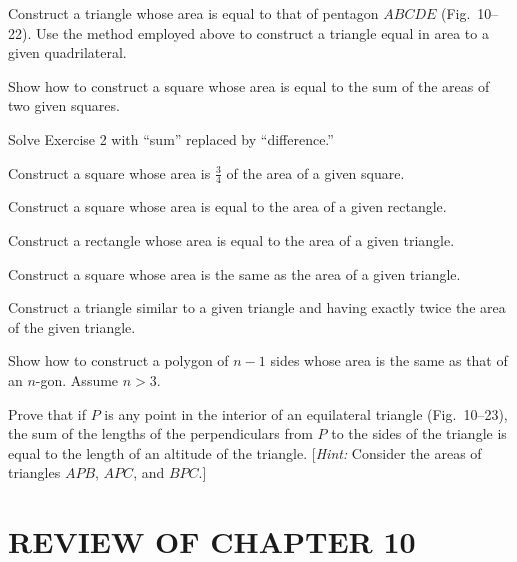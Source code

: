 \documentclass[11pt]{book}
\begin{document}
\FIGXTWENTYONE

\begin{exercisecols}
\begin{exlist}
\item Construct a triangle whose area is equal to that of pentagon $ABCDE$
  (Fig.~10--22). Use the method employed above to construct a triangle equal in
  area to a given quadrilateral.
\exfig{\FIGXTWENTYTWO}
\item Show how to construct a square whose area is equal to the sum of the
  areas of two given squares.
\item Solve Exercise 2 with ``sum'' replaced by ``difference.''
\item Construct a square whose area is $\frac{3}{4}$ of the area of a given
  square.
\item Construct a square whose area is equal to the area of a given rectangle.
\item Construct a rectangle whose area is equal to the area of a given
  triangle.
\item Construct a square whose area is the same as the area of a given
  triangle.
\item Construct a triangle similar to a given triangle and having exactly twice
  the area of the given triangle.
\item Show how to construct a polygon of $n - 1$ sides whose area is the same
  as that of an $n$-gon. Assume $n > 3$.
\item[\stex 10.] Prove that if $P$ is any point in the interior of an
  equilateral triangle (Fig.~10--23), the sum of the lengths of the
  perpendiculars from $P$ to the sides of the triangle is equal to the length
  of an altitude of the triangle. [\emph{Hint:} Consider the areas of triangles
  $APB$, $APC$, and $BPC$.]
\exfig{\FIGXTWENTYTHREE}
\end{exlist}
\end{exercisecols}

\section*{REVIEW OF CHAPTER 10}
\end{document}
